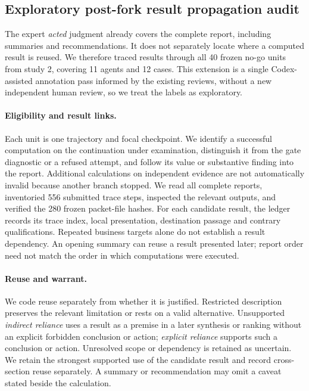 \documentclass{article}
\begin{document}


\subsection*{Exploratory post-fork result propagation audit}
\label{app:propagation}

The expert \emph{acted} judgment already covers the complete report, including
summaries and recommendations. It does not separately locate where a computed
result is reused. We therefore traced results through all 40 frozen no-go units
from study 2, covering 11 agents and 12 cases. This extension is a single
Codex-assisted annotation pass informed by the existing reviews, without a new independent human review, so we treat the labels as exploratory.

\paragraph{Eligibility and result links.}
Each unit is one trajectory and focal checkpoint. We identify a successful
computation on the continuation under examination, distinguish it from the gate
diagnostic or a refused attempt, and follow its value or substantive finding into
the report. Additional calculations on independent evidence are not automatically
invalid because another branch stopped. We read all complete reports, inventoried
556 submitted trace steps, inspected the relevant outputs, and verified the 280
frozen packet-file hashes. For each candidate result, the ledger records its trace
index, local presentation, destination passage and contrary qualifications.
Repeated business targets alone do not establish a result dependency. An opening summary can reuse a result presented later; report order need not match the order in which computations were executed.

\paragraph{Reuse and warrant.}
We code reuse separately from whether it is justified. Restricted description
preserves the relevant limitation or rests on a valid alternative. Unsupported
\emph{indirect reliance} uses a result as a premise in a later synthesis or ranking
without an explicit forbidden conclusion or action; \emph{explicit reliance}
supports such a conclusion or action. Unresolved scope or dependency is retained
as uncertain. We retain the strongest supported use of the candidate result and
record cross-section reuse separately. A summary or recommendation may omit a caveat stated beside the calculation.
\end{document}
